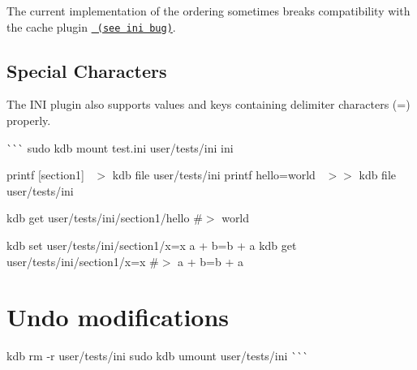 The current implementation of the ordering sometimes breaks compatibility with the cache plugin \href{https://github.com/ElektraInitiative/libelektra/issues/2592}{\texttt{ (see ini bug)}}.\hypertarget{autotoc_md292_autotoc_md319}{}\subsection{Special Characters}\label{autotoc_md292_autotoc_md319}
The I\+NI plugin also supports values and keys containing delimiter characters ({\ttfamily =}) properly.

\`{}\`{}\`{} sudo kdb mount test.\+ini user/tests/ini ini

printf \textquotesingle{}\mbox{[}section1\mbox{]}~\newline
\textquotesingle{} $>$ {\ttfamily kdb file user/tests/ini} printf \textquotesingle{}hello=world~\newline
\textquotesingle{} $>$$>$ {\ttfamily kdb file user/tests/ini}

kdb get user/tests/ini/section1/hello \#$>$ world

kdb set user/tests/ini/section1/x=x \textquotesingle{}a + b=b + a\textquotesingle{} kdb get user/tests/ini/section1/x=x \#$>$ a + b=b + a\hypertarget{autotoc_md292_autotoc_md320}{}\section{Undo modifications}\label{autotoc_md292_autotoc_md320}
kdb rm -\/r user/tests/ini sudo kdb umount user/tests/ini \`{}\`{}\`{} 